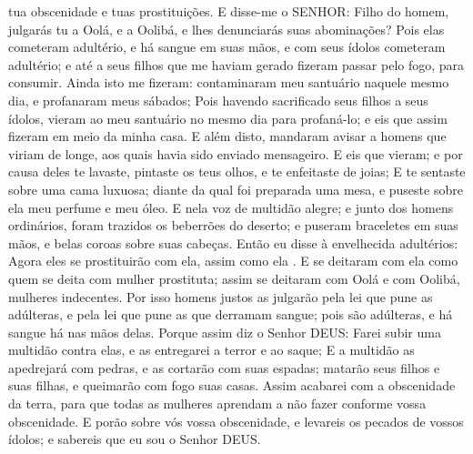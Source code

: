 {{} tua obscenidade e
{} tuas prostituições.
E disse-me o SENHOR: Filho do homem, julgarás tu a Oolá, e a Oolibá, e lhes denunciarás suas abominações?
Pois elas cometeram adultério, e há sangue em suas mãos, e com seus ídolos cometeram adultério; e até a seus filhos que me haviam gerado fizeram passar pelo fogo, para
{} consumir.
Ainda isto me fizeram: contaminaram meu santuário naquele mesmo dia, e profanaram meus sábados;
Pois havendo sacrificado seus filhos a seus ídolos, vieram ao meu santuário no mesmo dia para profaná-lo; e eis que assim fizeram em meio da minha casa.
E além disto, mandaram avisar a homens que viriam de longe, aos quais havia sido enviado mensageiro. E eis que vieram; e por causa deles te lavaste, pintaste os teus olhos, e te enfeitaste de joias;
E te sentaste sobre uma cama luxuosa; diante da qual foi preparada uma mesa, e puseste sobre ela meu perfume e meu óleo.
E
{} nela voz de multidão alegre; e junto dos homens ordinários, foram trazidos os beberrões
 do deserto; e puseram braceletes em suas mãos, e belas coroas sobre suas cabeças.
Então eu disse à envelhecida
{} adultérios: Agora eles se prostituirão com ela, assim como ela
{} .
E se deitaram com ela como quem se deita com mulher prostituta; assim se deitaram com Oolá e com Oolibá, mulheres indecentes.
Por isso homens justos as julgarão pela lei que pune as adúlteras, e pela lei que pune as que derramam sangue; pois são adúlteras, e há sangue há nas mãos delas.
Porque assim diz o Senhor DEUS: Farei subir uma multidão contra elas, e as entregarei a terror e ao saque;
E a multidão as apedrejará com pedras, e as cortarão com suas espadas; matarão seus filhos e suas filhas, e queimarão com fogo suas casas.
Assim acabarei com a obscenidade da terra, para que todas as mulheres aprendam a não fazer conforme vossa obscenidade.
E porão sobre vós
{} vossa obscenidade, e levareis os pecados de vossos ídolos; e sabereis que eu sou o Senhor DEUS.

}
